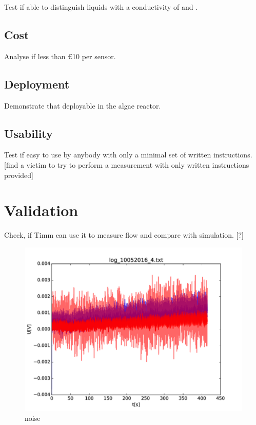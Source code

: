 Test if able to distinguish liquids with a conductivity of  and .

\subsection{Cost}

Analyse if less than \euro{10} per sensor.

\subsection{Deployment}

Demonstrate that deployable in the algae reactor.

\subsection{Usability}

Test if easy to use by anybody with only a minimal set of written instructions. [find a victim to try to perform a measurement with only written instructions provided]

\section{Validation}

Check, if Timm can use it to measure flow and compare with simulation. [?]

\begin{figure}
	\begin{center}
		\includegraphics[width=\textwidth]{images/noise.pdf} 
		\caption{noise}
	\end{center}
\end{figure}

